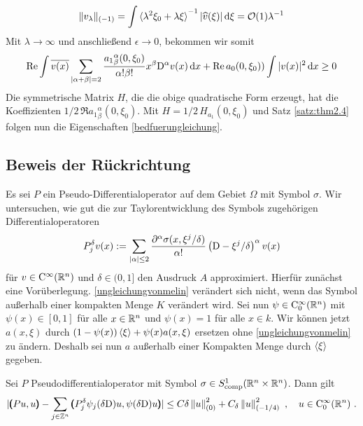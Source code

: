 \begin{align*}
\|v_\lambda\|_{(-1)} = \int \braket{\lambda^2\xi_0+\lambda \xi}^{-1}|\widehat{v}(\xi)|\,\mathrm d\xi = \mathcal{O}(1)\lambda^{-1} 
\end{align*}
Mit $\lambda\to\infty$ und anschließend $\epsilon \to 0$, bekommen wir somit
\begin{align*}
\operatorname{Re}\int \overline{v(x)}\sum_{\lvert\alpha+\beta\rvert=2}\frac{{a_1}^\alpha_\beta(0,\xi_0)}{\alpha!\beta!}x^\beta\mathrm D^\alpha v(x)\,\mathrm d x + \operatorname{Re} a_0(0,\xi_0))\int|v(x)|^2\,\mathrm d x\ge 0
\end{align*}
Die symmetrische Matrix $H$, die die obige quadratische Form erzeugt, hat die Koeffizienten $1/2\,\Re {a_1}^\alpha_\beta(0,\xi_0)$. Mit $H=1/2\, H_{a_1}(0,\xi_0)$ und Satz \ref{satz:thm2.4} folgen nun die Eigenschaften \eqref{bedfuerungleichung}.

\subsection{Beweis der Rückrichtung}

Es sei $P$ ein Pseudo-Differentialoperator auf dem Gebiet $\Omega$ mit Symbol $\sigma$. Wir untersuchen, wie gut die zur Taylorentwicklung des Symbols zugehörigen Differentialoperatoren
\begin{align}
 P_j^\delta v (x):=\sum_{\lvert\alpha\rvert \le 2} \frac{\partial ^\alpha\sigma(x,\xi^j/\delta)}{\alpha!}\left( \mathrm D - \xi^j/\delta\right)^\alpha v(x)
\end{align}
für $v\in\mathrm {C}^\infty(\mathbb R^n)$ und $\delta\in(0,1]$ den Ausdruck $A$ approximiert. Hierfür zunächst eine Vorüberlegung. \eqref{ungleichungvonmelin} verändert sich nicht, wenn das Symbol außerhalb einer kompakten Menge $K$ verändert wird. Sei nun $\psi\in\mathrm{C}^\infty_0(\mathbb R^n)$ mit $\psi(x)\in[0,1]$ für alle $x\in\mathbb R^n$ und $\psi(x)=1$ für alle $x\in k$. Wir können jetzt $a(x,\xi)$ durch $(1-\psi(x))\braket{\xi} + \psi(x)a(x,\xi)$ ersetzen ohne \eqref{ungleichungvonmelin} zu ändern. Deshalb sei nun $a$ außerhalb einer Kompakten Menge durch $\braket{\xi}$ gegeben.

\begin{lem}
Sei $P$ Pseudodifferentialoperator mit Symbol $\sigma\in S^1_{\rm comp}(\mathbb R^n\times\mathbb R^n)$. Dann gilt
\begin{align}\label{hilfsungl1}
\lvert
\pmb(P u,u\pmb) - \sum_{j\in\mathbb Z^n}\pmb( P_j^\delta\psi_j(\delta\mathrm D )u, \psi(\delta\mathrm D )u \pmb)
\rvert
\le C\delta \left\lVert u\right\rVert ^2_{(0)} + C_\delta \left\lVert u\right\rVert ^2_{(-1/4)}\ ,\quad u\in\mathrm {C}^\infty_0(\mathbb R^n)\ .
\end{align}
\end{lem}

